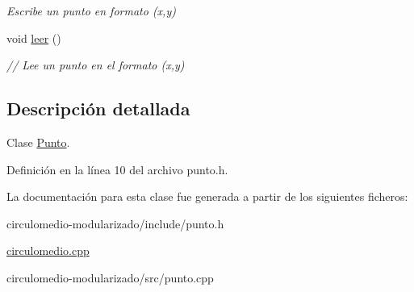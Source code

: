 \begin{DoxyCompactItemize}
\begin{DoxyCompactList}\small\item\em Escribe un punto en formato (x,y) \end{DoxyCompactList}\item 
void \hyperlink{classPunto_a84cc9b0ee2e5b00842e7bff819b80459}{leer} ()\hypertarget{classPunto_a84cc9b0ee2e5b00842e7bff819b80459}{}\label{classPunto_a84cc9b0ee2e5b00842e7bff819b80459}

\begin{DoxyCompactList}\small\item\em // Lee un punto en el formato (x,y) \end{DoxyCompactList}\end{DoxyCompactItemize}


\subsection{Descripción detallada}
Clase \hyperlink{classPunto}{Punto}. 

Definición en la línea 10 del archivo punto.\+h.



La documentación para esta clase fue generada a partir de los siguientes ficheros\+:\begin{DoxyCompactItemize}
\item 
circulomedio-\/modularizado/include/punto.\+h\item 
\hyperlink{circulomedio_8cpp}{circulomedio.\+cpp}\item 
circulomedio-\/modularizado/src/punto.\+cpp\end{DoxyCompactItemize}
